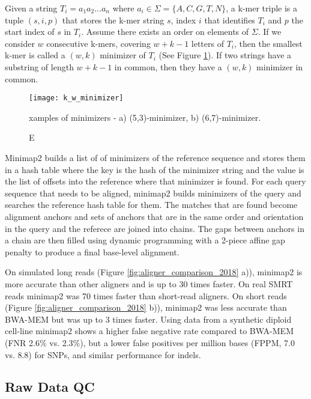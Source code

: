 Given a string $T_i=a_1a_2...a_n$ where $a_i \in \Sigma = \{A,C,G,T,N\}$, a k-mer triple is a tuple $(s,i,p)$ that stores the k-mer string $s$, index $i$ that identifies $T_i$ and $p$ the start index of $s$ in $T_i$. Assume there exists an order on elements of $\Sigma$. If we consider $w$ consecutive k-mers, covering $w+k-1$ letters of $T_i$, then the smallest k-mer is called a $(w,k)$ minimizer of $T_i$ (See Figure \ref{fig:k_w_minimizer}). If two strings have a substring of length $w+k-1$ in common, then they have a $(w,k)$ minimizer in common.

\begin{figure}[H]
    \texttt{[image: k\_w\_minimizer]}
    \centering
    \caption Examples of minimizers - a) (5,3)-minimizer, b) (6,7)-minimizer.\autocite{roberts2004reducing}
    \label{fig:k_w_minimizer}
\end{figure}

Minimap2 builds a list of of minimizers of the reference sequence and stores them in a hash table where the key is the hash of the minimizer string and the value is the list of offsets into the reference where that minimizer is found. For each query sequence that needs to be aligned, minimap2 builds minimizers of the query and searches the reference hash table for them. The matches that are found become alignment anchors and sets of anchors that are in the same order and orientation in the query and the referece are joined into chains. The gaps between anchors in a chain are then filled using dynamic programming with a 2-piece affine gap penalty to produce a final base-level alignment.

On simulated long reads (Figure \ref{fig:aligner_comparison_2018} a)), minimap2 is more accurate than other aligners and is up to 30 times faster. On real SMRT reads minimap2 was 70 times faster than short-read aligners. On short reads (Figure \ref{fig:aligner_comparison_2018} b)), minimap2 was less accurate than BWA-MEM but was up to 3 times faster. Using data from a synthetic diploid cell-line\autocite{li2018synthetic} minimap2 shows a higher false negative rate compared to BWA-MEM (FNR 2.6\% vs. 2.3\%), but a lower false positives per million bases (FPPM, 7.0 vs. 8.8) for SNPs, and similar performance for indels.

\subsection{Raw Data QC}
\label{sec:bg_raw_data_qc}

